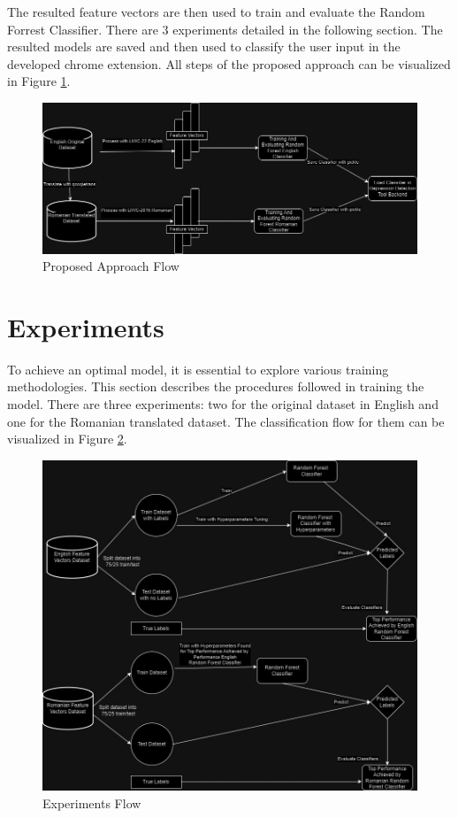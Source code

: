 The resulted feature vectors are then used to train and evaluate the Random Forrest Classifier. There are 3 experiments detailed in the following section. The resulted models are saved and then used to classify the user input in the developed chrome extension. All steps of the proposed approach can be visualized in Figure \ref{proposedApproachFlow}.

\begin{figure}[htbp]
	\centering
		\includegraphics[scale=0.47]{LaTeX Bachelor Thesis Depression Signs Detection/figures/FlowModel.jpg}
	\caption{Proposed Approach Flow}
	\label{proposedApproachFlow}
\end{figure}


\section{Experiments}

\quad To achieve an optimal model, it is essential to explore various training methodologies. This section describes the procedures followed in training the model. There are three experiments: two for the original dataset in English and one for the Romanian translated dataset. The classification flow for them can be visualized in Figure \ref{experimentsFlow}.

\begin{figure}[htbp]
	\centering
		\includegraphics[scale=0.5]{LaTeX Bachelor Thesis Depression Signs Detection/figures/ClassificationFlow.jpg}
	\caption{Experiments Flow}
	\label{experimentsFlow}
\end{figure}

